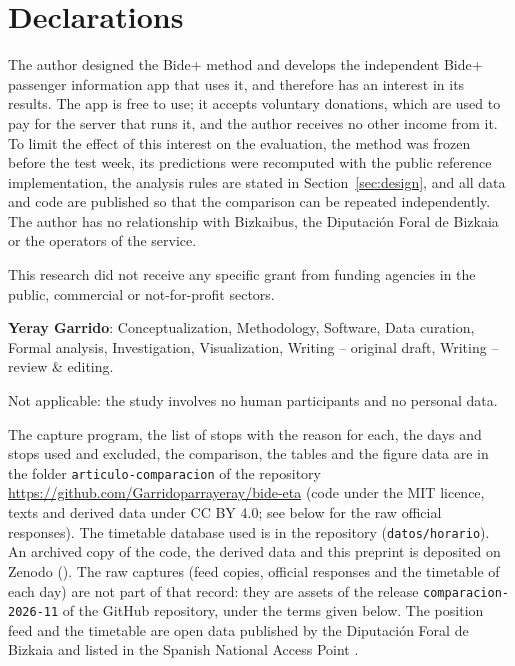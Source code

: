 \section*{Declarations}

The author designed the Bide+ method and develops the independent Bide+ passenger information app that uses it, and
therefore has an interest in its results. The app is free to use; it accepts voluntary donations, which are used to pay
for the server that runs it, and the author receives no other income from it. To limit the effect of this interest on the evaluation, the method was frozen
before the test week, its predictions were recomputed with the public reference implementation, the analysis rules are
stated in Section~\ref{sec:design}, and all data and code are published so that the comparison can be repeated
independently. The author has no relationship with Bizkaibus, the Diputación Foral de Bizkaia or the operators of the
service.


This research did not receive any specific grant from funding agencies in the public, commercial or not-for-profit
sectors.


\textbf{Yeray Garrido}: Conceptualization, Methodology, Software, Data curation, Formal analysis, Investigation,
Visualization, Writing -- original draft, Writing -- review \& editing.


Not applicable: the study involves no human participants and no personal data.


The capture program, the list of stops with the reason for each, the days and stops used and excluded, the comparison,
the tables and the figure data are in the folder \texttt{articulo-comparacion} of the repository
\url{https://github.com/Garridoparrayeray/bide-eta} (code under the MIT licence, texts and derived data under CC BY 4.0; see below for the raw official responses).
The timetable database used is in the repository (\texttt{datos/horario}). An archived copy of the code, the derived data and this
preprint is deposited on Zenodo (\doidatos). The raw captures (feed copies, official responses and the timetable of
each day) are not part of that record: they are assets of the release \texttt{comparacion-2026-11} of the GitHub
repository, under the terms given below. The position feed and the timetable are open data published by the Diputación Foral de Bizkaia and listed in
the Spanish National Access Point \parencite{nap}.

